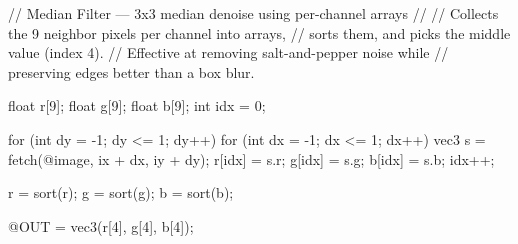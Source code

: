 // Median Filter — 3x3 median denoise using per-channel arrays
//
// Collects the 9 neighbor pixels per channel into arrays,
// sorts them, and picks the middle value (index 4).
// Effective at removing salt-and-pepper noise while
// preserving edges better than a box blur.

float r[9];
float g[9];
float b[9];
int idx = 0;

for (int dy = -1; dy <= 1; dy++) {
    for (int dx = -1; dx <= 1; dx++) {
        vec3 s = fetch(@image, ix + dx, iy + dy);
        r[idx] = s.r;
        g[idx] = s.g;
        b[idx] = s.b;
        idx++;
    }
}

r = sort(r);
g = sort(g);
b = sort(b);

@OUT = vec3(r[4], g[4], b[4]);
